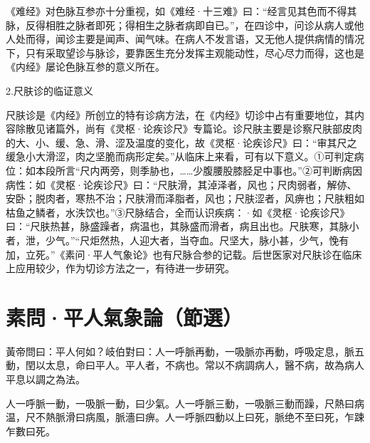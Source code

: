 \documentclass[12pt]{ctexbook}
\begin{document}
《难经》对色脉互参亦十分重视，如《难经·十三难》曰：“经言见其色而不得其脉，反得相胜之脉者即死；得相生之脉者病即自已。”，在四诊中，问诊从病人或他人处而得，闻诊主要是闻声、闻气味。在病人不发言语，又无他人提供病情的情况下，只有采取望诊与脉诊，要靠医生充分发挥主观能动性，尽心尽力而得，这也是《内经》屡论色脉互参的意义所在。

2.尺肤诊的临证意义

尺肤诊是《内经》所创立的特有诊病方法，在《内经》切诊中占有重要地位，其内容除散见诸篇外，尚有《灵枢·论疾诊尺》专篇论。诊尺肤主要是诊察尺肤部皮肉的大、小、缓、急、滑、涩及温度的变化，故《灵枢·论疾诊尺》曰：“审其尺之缓急小大滑涩，肉之坚脆而病形定矣。”从临床上来看，可有以下意义。①可判定病位：如本段所言“尺内两旁，则季胁也，……少腹腰股膝胫足中事也。”②可判断病因病性：如《灵枢·论疾诊尺》曰：“尺肤滑，其淖泽者，风也；尺肉弱者，解㑊、安卧；脱肉者，寒热不治；尺肤滑而泽脂者，风也；尺肤涩者，风痹也；尺肤粗如枯鱼之鳞者，水泆饮也。”③尺脉结合，全而认识疾病：·如《灵枢·论疾诊尺》曰：“尺肤热甚，脉盛躁者，病温也，其脉盛而滑者，病且出也。尺肤寒，其脉小者，泄，少气。”“尺炬然热，人迎大者，当夺血。尺坚大，脉小甚，少气，悗有加，立死。”《素问·平人气象论》也有尺脉合参的记载。后世医家对尺肤诊在临床上应用较少，作为切诊方法之一，有待进一步研究。

\section{素問·平人氣象論（節選）}%


\begin{yuanwen}
黃帝問曰：平人何如？岐伯對曰：人一呼脈再動，一吸脈亦再動，呼吸定息，脈五動，閏以太息，命曰平人。平人者，不病也。常以不病調病人，醫不病，故為病人平息以調之為法。

人一呼脈一動，一吸脈一動，曰少氣。人一呼脈三動，一吸脈三動而躁，尺熱曰病温，尺不熱脈滑曰病風，脈濇曰痹。人一呼脈四動以上曰死，脈绝不至曰死，乍踈乍數曰死。
\end{yuanwen}

\end{document}
